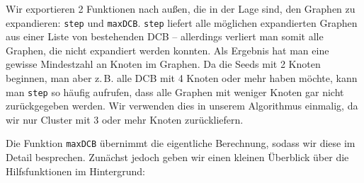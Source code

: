 \documentclass[a4paper]{scrartcl}
\begin{document}
Wir exportieren 2 Funktionen nach außen, die in der Lage sind, den Graphen zu expandieren: \texttt{step} und \texttt{maxDCB}. \texttt{step} liefert alle möglichen expandierten Graphen aus einer Liste von bestehenden DCB -- allerdings verliert man somit alle Graphen, die nicht expandiert werden konnten. Als Ergebnis hat man eine gewisse Mindestzahl an Knoten im Graphen. Da die Seeds mit 2 Knoten beginnen, man aber z.\,B. alle DCB mit 4 Knoten oder mehr haben möchte, kann man \texttt{step} so häufig aufrufen, dass alle Graphen mit weniger Knoten gar nicht zurückgegeben werden. Wir verwenden dies in unserem Algorithmus einmalig, da wir nur Cluster mit 3 oder mehr Knoten zurückliefern.\par
\medskip
Die Funktion \texttt{maxDCB} übernimmt die eigentliche Berechnung, sodass wir diese im Detail besprechen. Zunächst jedoch geben wir einen kleinen Überblick über die Hilfsfunktionen im Hintergrund:
\end{document}
